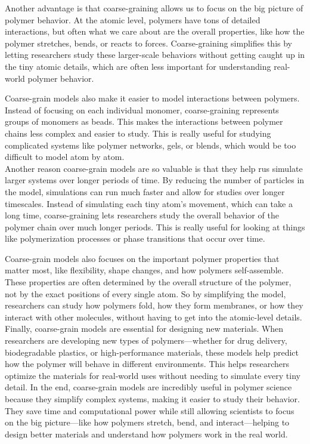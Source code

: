 \documentclass[12pt]{article}
\begin{document}
\begin{flushleft}
	Another advantage is that coarse-graining allows us to focus on the big picture of polymer behavior. At the atomic level, polymers have tons of detailed interactions, but often what we care about are the overall properties, like how the polymer stretches, bends, or reacts to forces. Coarse-graining simplifies this by letting researchers study these larger-scale behaviors without getting caught up in the tiny atomic details, which are often less important for understanding real-world polymer behavior.
	
	Coarse-grain models also make it easier to model interactions between polymers. Instead of focusing on each individual monomer, coarse-graining represents groups of monomers as beads. This makes the interactions between polymer chains less complex and easier to study. This is really useful for studying complicated systems like polymer networks, gels, or blends, which would be too difficult to model atom by atom.\\
	
	
	Another reason coarse-grain models are so valuable is that they help rus simulate larger systems over longer periods of time. By reducing the number of particles in the model, simulations can run much faster and allow for studies over longer timescales. Instead of simulating each tiny atom’s movement, which can take a long time, coarse-graining lets researchers study the overall behavior of the polymer chain over much longer periods. This is really useful for looking at things like polymerization processes or phase transitions that occur over time.
	
	Coarse-grain models also focuses on the important polymer properties that matter most, like flexibility, shape changes, and how polymers self-assemble. These properties are often determined by the overall structure of the polymer, not by the exact positions of every single atom. So by simplifying the model, researchers can study how polymers fold, how they form membranes, or how they interact with other molecules, without having to get into the atomic-level details.\\
	
	Finally, coarse-grain models are essential for designing new materials. When researchers are developing new types of polymers—whether for drug delivery, biodegradable plastics, or high-performance materials, these models help predict how the polymer will behave in different environments. This helps researchers optimize the materials for real-world uses without needing to simulate every tiny detail.
	In the end, coarse-grain models are incredibly useful in polymer science because they simplify complex systems, making it easier to study their behavior. They save time and computational power while still allowing scientists to focus on the big picture—like how polymers stretch, bend, and interact—helping to design better materials and understand how polymers work in the real world.
	




\end{flushleft}
\end{document}

